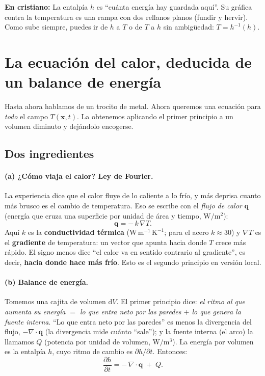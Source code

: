 \documentclass[11pt]{article}
\newcommand{\dd}{\mathrm{d}}
\newcommand{\grad}{\nabla}
\theoremstyle{definition}
\theoremstyle{plain}
\newcommand{\dummies}[1]{%
  \par\smallskip\noindent
  \colorbox{yellow!18}{\parbox{\dimexpr\linewidth-2\fboxsep}{%
  \small\textbf{En cristiano:} #1}}\par\smallskip}
\begin{document}
\dummies{La entalpía $h$ es ``cuánta energía hay guardada aquí''. Su gráfica contra
la temperatura es una rampa con dos rellanos planos (fundir y hervir). Como sube
siempre, puedes ir de $h$ a $T$ o de $T$ a $h$ sin ambigüedad: $T=h^{-1}(h)$.}

\section{La ecuación del calor, deducida de un balance de energía}
\label{sec:calor}

Hasta ahora hablamos de un trocito de metal. Ahora queremos una ecuación para
\emph{todo} el campo $T(\bm x,t)$. La obtenemos aplicando el primer principio a un
volumen diminuto y dejándolo encogerse.

\subsection{Dos ingredientes}

\paragraph{(a) ¿Cómo viaja el calor? Ley de Fourier.} La experiencia dice que el
calor fluye de lo caliente a lo frío, y más deprisa cuanto más brusco es el cambio
de temperatura. Eso se escribe con el \emph{flujo de calor} $\bm q$ (energía que
cruza una superficie por unidad de área y tiempo, $\mathrm{W/m^2}$):
\begin{equation}
  \bm q = -\,k\,\grad T.
  \label{eq:fourier}
\end{equation}
Aquí $k$ es la \textbf{conductividad térmica} ($\mathrm{W\,m^{-1}\,K^{-1}}$; para
el acero $k\approx 30$) y $\grad T$ es el \textbf{gradiente} de temperatura: un
vector que apunta hacia donde $T$ crece más rápido. El signo menos dice ``el calor
va en sentido contrario al gradiente'', es decir, \textbf{hacia donde hace más
frío}. Esto es el segundo principio en versión local.

\paragraph{(b) Balance de energía.} Tomemos una cajita de volumen $\dd V$. El
primer principio dice: \emph{el ritmo al que aumenta su energía $=$ lo que entra
neto por las paredes $+$ lo que genera la fuente interna}. ``Lo que entra neto por
las paredes'' es menos la divergencia del flujo, $-\grad\!\cdot\!\bm q$ (la
divergencia mide cuánto ``sale''); y la fuente interna (el arco) la llamamos $Q$
(potencia por unidad de volumen, $\mathrm{W/m^3}$). La energía por volumen es la
entalpía $h$, cuyo ritmo de cambio es $\partial h/\partial t$. Entonces:
\begin{equation}
  \frac{\partial h}{\partial t} = -\,\grad\!\cdot\!\bm q \;+\; Q.
  \label{eq:balance}
\end{equation}
\end{document}
